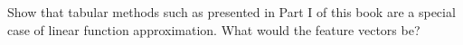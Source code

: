 
\begin{exercise}[Exercise 9.1]

Show that tabular methods such as presented in Part I of this book are a special case of linear function approximation.
What would the feature vectors be?

\end{exercise}


\begin{solution}

\phantom{}

\end{solution}

